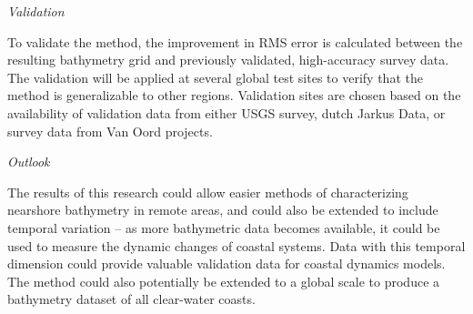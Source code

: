 \noindent\emph{Validation}

To validate the method, the improvement in RMS error is calculated between the resulting bathymetry grid and previously validated, high-accuracy survey data. The validation will be applied at several global test sites to verify that the method is generalizable to other regions. Validation sites are chosen based on the availability of validation data from either USGS survey, dutch Jarkus Data, or survey data from Van Oord projects. 

\noindent\emph{Outlook} 

The results of this research could allow easier methods of characterizing nearshore bathymetry in remote areas, and could also be extended to include temporal variation – as more bathymetric data becomes available, it could be used to measure the dynamic changes of coastal systems. Data with this temporal dimension could provide valuable validation data for coastal dynamics models. The method could also potentially be extended to a global scale to produce a bathymetry dataset of all clear-water coasts.
